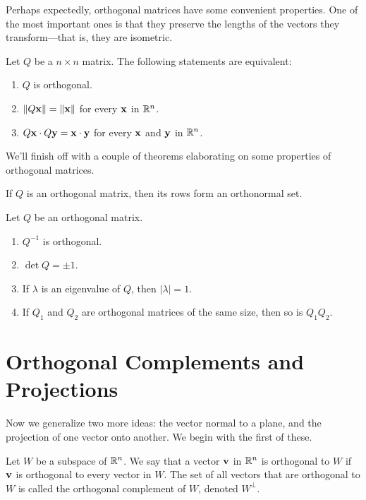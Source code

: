 \documentclass[../m073main.tex]{subfiles}
\begin{document}
Perhaps expectedly, orthogonal matrices have some convenient properties.
One of the most important ones is that they preserve the lengths of the vectors they transform---that is, they are isometric.

\begin{theorem}
	Let $Q$ be a $n \times n$ matrix.
	The following statements are equivalent:
	\begin{enumerate}[label=(\alph*)]
		\item $Q$ is orthogonal.
		\item $\|Q \mathbf{x}\| = \|\mathbf{x}\|$ for every $\mathbf{x}$ in $\mathbb{R}^n$.
		\item $Q \mathbf{x} \cdot Q \mathbf{y} = \mathbf{x} \cdot \mathbf{y}$ for every $\mathbf{x}$ and $\mathbf{y}$ in $\mathbb{R}^n$.
	\end{enumerate}
\end{theorem}

We'll finish off with a couple of theorems elaborating on some properties of orthogonal matrices.

\begin{theorem}
	If $Q$ is an orthogonal matrix, then its rows form an orthonormal set.
\end{theorem}

\begin{theorem}
	Let $Q$ be an orthogonal matrix.
	\begin{enumerate}[label=(\alph*)]
		\item $Q^{-1}$ is orthogonal.
		\item $\det Q = \pm 1$.
		\item If $\lambda$ is an eigenvalue of $Q$, then $|\lambda| = 1$.
		\item If $Q_1$ and $Q_2$ are orthogonal matrices of the same size, then so is $Q_1 Q_2$.
	\end{enumerate}
\end{theorem}

\section{Orthogonal Complements and Projections}
Now we generalize two more ideas: the vector normal to a plane, and the projection of one vector onto another.           
We begin with the first of these.

\begin{definition}
	Let $W$ be a subspace of $\mathbb{R}^n$.
	We say that a vector $\mathbf{v}$ in $\mathbb{R}^n$ is orthogonal to $W$ if $\mathbf{v}$ is orthogonal to every vector in $W$.
	The set of all vectors that are orthogonal to $W$ is called the orthogonal complement of $W$, denoted $W^\perp$.
\end{definition}
\end{document}
